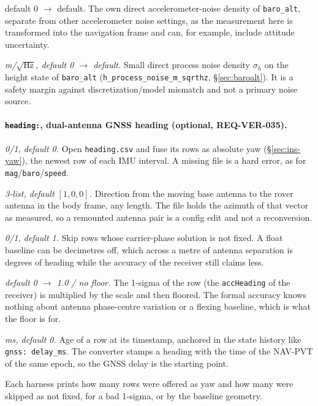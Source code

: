 \documentclass[11pt,a4paper]{article}
\newcommand{\code}[1]{\texttt{#1}}
\begin{document}
\begin{description}
{    default 0 $\to$ default.} The own direct accelerometer-noise density of
    \code{baro\_\allowbreak{}alt}, separate from other accelerometer noise
    settings, as the measurement here is transformed into the navigation frame
    and can, for example, include attitude uncertainty.
  \item[\code{baro: h\_\allowbreak{}process\_\allowbreak{}noise}] \emph{m/$\sqrt{\text{Hz}}$, default
    0 $\to$ default.} Small direct process noise
    density $\sigma_h$ on the height state of \code{baro\_\allowbreak{}alt}
    (\code{h\_\allowbreak{}process\_\allowbreak{}noise\_\allowbreak{}m\_\allowbreak{}sqrthz}, \S\ref{sec:baroalt}).
    It is a safety margin against discretization/model mismatch and not a
    primary noise source.
\end{description}

\paragraph{\code{heading:}, dual-antenna GNSS heading (optional, REQ-VER-035).}
\begin{description}\setlength\itemsep{0pt}
  \item[\code{heading: enable}] \emph{0/1, default 0.} Open
    \code{heading.csv} and fuse its rows as absolute yaw
    (\S\ref{sec:ins-yaw}), the newest row of each IMU interval. A missing
    file is a hard error, as for \code{mag}/\code{baro}/\code{speed}.
  \item[\code{heading: baseline\_\allowbreak{}frd}] \emph{3-list, default
    $[1,0,0]$.} Direction from the moving base antenna to the rover
    antenna in the body frame, any length. The file holds the azimuth of
    that vector as measured, so a remounted antenna pair is a config
    edit and not a reconversion.
  \item[\code{heading: require\_\allowbreak{}fixed}] \emph{0/1, default 1.}
    Skip rows whose carrier-phase solution is not fixed. A float baseline
    can be decimetres off, which across a metre of antenna separation is
    degrees of heading while the accuracy of the receiver still claims less.
  \item[\code{heading: stddev\_\allowbreak{}scale},
    \code{heading: stddev\_\allowbreak{}min\_\allowbreak{}deg}]
    \emph{default 0 $\to$ 1.0 / no floor.} The 1-sigma of the row (the
    \code{accHeading} of the receiver) is multiplied by the scale and then
    floored. The formal accuracy knows nothing about antenna phase-centre
    variation or a flexing baseline, which is what the floor is for.
  \item[\code{heading: delay\_\allowbreak{}ms}] \emph{ms, default 0.}
    Age of a row at its timestamp, anchored in the state history like
    \code{gnss: delay\_\allowbreak{}ms}. The converter stamps a heading
    with the time of the NAV-PVT of the same epoch, so the GNSS delay is
    the starting point.
\end{description}
Each harness prints how many rows were offered as yaw and how many were
skipped as not fixed, for a bad 1-sigma, or by the baseline geometry.
\end{document}
